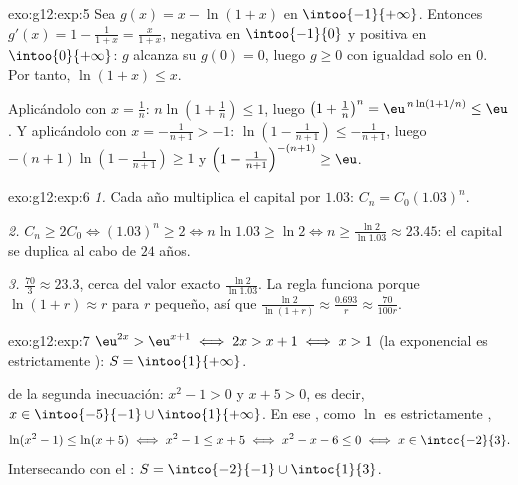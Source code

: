 \begin{solution}{exo:g12:exp:5}
Sea $g(x) = x - \ln(1+x)$ en $\intoo{-1}{+\infty}$. Entonces
$g'(x) = 1 - \frac{1}{1+x} = \frac{x}{1+x}$, negativa en $\intoo{-1}{0}$ y
positiva en $\intoo{0}{+\infty}$: $g$ alcanza su  $g(0) = 0$, luego
$g \geq 0$ con igualdad solo en $0$. Por tanto, $\ln(1+x) \leq x$.

Aplicándolo con $x = \frac1n$: $n\ln\left(1 + \frac1n\right) \leq 1$, luego
$\left(1+\frac1n\right)^n = \eu^{\,n\ln(1+1/n)} \leq \eu$. Y aplicándolo
con $x = -\frac{1}{n+1} > -1$:
$\ln\left(1 - \frac{1}{n+1}\right) \leq -\frac{1}{n+1}$, luego
$-(n+1)\ln\left(1 - \frac{1}{n+1}\right) \geq 1$ y
$\left(1 - \frac{1}{n+1}\right)^{-(n+1)} \geq \eu$.
\end{solution}

\begin{solution}{exo:g12:exp:6}
\emph{1.} Cada año multiplica el capital por $1.03$: $C_n = C_0 (1.03)^n$.

\emph{2.} $C_n \geq 2C_0 \iff (1.03)^n \geq 2 \iff n \ln 1.03 \geq \ln 2
\iff n \geq \frac{\ln 2}{\ln 1.03} \approx 23.45$: el capital se duplica al
cabo de $24$ años.

\emph{3.} $\frac{70}{3} \approx 23.3$, cerca del valor exacto
$\frac{\ln 2}{\ln 1.03}$. La regla funciona porque
$\ln(1 + r) \approx r$ para $r$ pequeño, así que
$\frac{\ln 2}{\ln(1+r)} \approx \frac{0.693}{r} \approx \frac{70}{100r}$.
\end{solution}

\begin{solution}{exo:g12:exp:7}
$\eu^{2x} > \eu^{x+1} \iff 2x > x + 1 \iff x > 1$ (la exponencial es
estrictamente ): $S = \intoo{1}{+\infty}$.

 de la segunda inecuación: $x^2 - 1 > 0$ y $x + 5 > 0$, es decir,
$x \in \intoo{-5}{-1} \cup \intoo{1}{+\infty}$. En ese , como $\ln$
es estrictamente ,
\[
\ln(x^2-1) \leq \ln(x+5) \iff x^2 - 1 \leq x + 5 \iff x^2 - x - 6 \leq 0
\iff x \in \intcc{-2}{3}.
\]
Intersecando con el : $S = \intco{-2}{-1} \cup \intoc{1}{3}$.
\end{solution}

